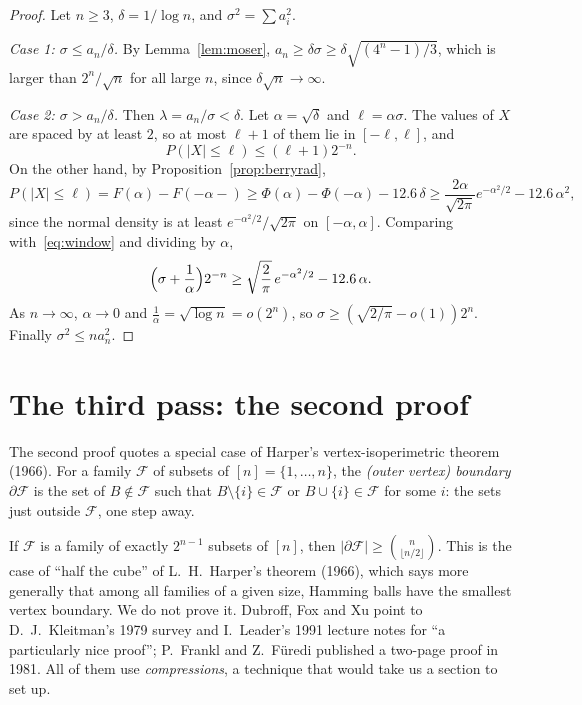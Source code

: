 \begin{proof}
Let $n\ge3$, $\delta=1/\log n$, and $\sigma^2=\sum a_i^2$.

\emph{Case 1: $\sigma\le a_n/\delta$.} By Lemma~\ref{lem:moser}, $a_n\ge\delta\sigma\ge\delta\sqrt{(4^n-1)/3}$, which is larger than $2^n/\sqrt n$ for all large $n$, since $\delta\sqrt n\to\infty$.

\emph{Case 2: $\sigma>a_n/\delta$.} Then $\lambda=a_n/\sigma<\delta$. Let $\alpha=\sqrt\delta$ and $\ell=\alpha\sigma$. The values of $X$ are spaced by at least $2$, so at most $\ell+1$ of them lie in
$[-\ell,\ell]$, and
\begin{equation}\label{eq:window}
P(|X|\le\ell)\le(\ell+1)2^{-n}.
\end{equation}
On the other hand, by Proposition~\ref{prop:berryrad},
\[
P(|X|\le\ell)=F(\alpha)-F(-\alpha-)\ge\Phi(\alpha)-\Phi(-\alpha)-12.6\,\delta\ge\frac{2\alpha}{\sqrt{2\pi}}e^{-\alpha^2/2}-12.6\,\alpha^2,
\]
since the normal density is at least $e^{-\alpha^2/2}/\sqrt{2\pi}$ on $[-\alpha,\alpha]$. Comparing with~\eqref{eq:window} and dividing by $\alpha$,
\[
\Bigl(\sigma+\frac1\alpha\Bigr)2^{-n}\ge\sqrt{\frac2\pi}\,e^{-\alpha^2/2}-12.6\,\alpha.
\]
As $n\to\infty$, $\alpha\to0$ and $\frac1\alpha=\sqrt{\log n}=o(2^n)$, so $\sigma\ge(\sqrt{2/\pi}-o(1))2^n$. Finally $\sigma^2\le na_n^2$.
\end{proof}

\section{The third pass: the second proof}\label{sec:secondproof}

The second proof quotes a special case of Harper's vertex-isoperimetric theorem (1966). For a family $\mathcal F$ of subsets of $[n]=\{1,\dots,n\}$, the \emph{(outer vertex)
boundary} $\partial\mathcal F$ is the set of $B\notin\mathcal F$ such that $B\setminus\{i\}\in\mathcal F$ or $B\cup\{i\}\in\mathcal F$ for some $i$: the sets just outside $\mathcal F$, one step away.

\begin{remark}\label{rem:harper}
If $\mathcal F$ is a family of exactly $2^{n-1}$ subsets of $[n]$, then $|\partial\mathcal F|\ge\binom n{\lfloor n/2\rfloor}$. This is the case of ``half the cube'' of
L.~H.~Harper's theorem (1966), which says more generally that among all families of a given size, Hamming balls have the smallest vertex boundary. We do not
prove it. Dubroff, Fox and Xu point to D.~J.~Kleitman's 1979 survey and I.~Leader's 1991 lecture notes for ``a particularly nice proof''; P.~Frankl and
Z.~F\"uredi published a two-page proof in 1981. All of them use \emph{compressions}, a technique that would take us a section to set up.
\end{remark}

